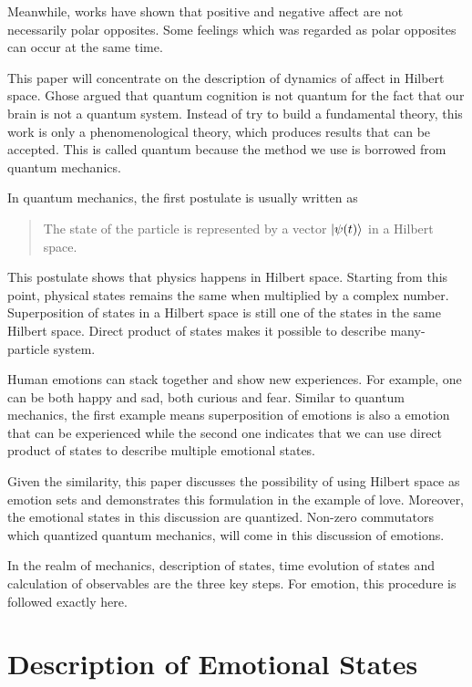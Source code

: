 \documentclass[%
 aip,
 jmp,%
 amsmath,amssymb,
 reprint,%
]{revtex4-1}
\begin{document}
Meanwhile, works have shown that positive and negative affect are not necessarily polar opposites. Some feelings which was regarded as polar opposites can occur at the same time.\cite{jtc-jjb,happySad}

This paper will concentrate on the description of dynamics of affect in Hilbert space. Ghose argued that quantum cognition is not quantum for the fact that our brain is not a quantum system. Instead of try to build a fundamental theory, this work is only a phenomenological theory, which produces results that can be accepted. This is called quantum because the method we use is borrowed from quantum mechanics.

In quantum mechanics, the first postulate is usually written as

\begin{quote}
The state of the particle is represented by a vector $\left| \psi(t)\right\rangle$ in a Hilbert space.\cite{shankar}
\end{quote}

This postulate shows that physics happens in Hilbert space. Starting from this point, physical states remains the same when multiplied by a complex number. Superposition of states in a Hilbert space is still one of the states in the same Hilbert space. Direct product of states makes it possible to describe many-particle system.

Human emotions can stack together and show new experiences. For example, one can be both happy and sad, both curious and fear. Similar to quantum mechanics, the first example means superposition of emotions is also a emotion that can be experienced while the second one indicates that we can use direct product of states to describe multiple emotional states.

Given the similarity, this paper discusses the possibility of using Hilbert space as emotion sets and demonstrates this formulation in the example of love. Moreover, the emotional states in this discussion are quantized. Non-zero commutators which quantized quantum mechanics, will come in this discussion of emotions.

In the realm of mechanics, description of states, time evolution of states and calculation of observables are the three key steps. For emotion, this procedure is followed exactly here.


\section{Description of Emotional States}
\end{document}
